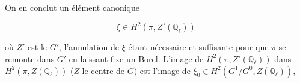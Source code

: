
On en conclut un élément canonique

\[
\xi\in H^2(\pi,Z'(\mathbb Q_\ell))
\]

où $Z'$ est le  $G'$, l'annulation de $\xi$ étant nécessaire et suffisante pour que $\pi$ se remonte dans $G'$ en laissant fixe  un Borel. L'image de $H^2(\pi,Z'(\mathbb Q_\ell))$ dans $H^2(\pi,Z(\mathbb Q_\ell))$ ($Z$ le centre de $G$)  est l'image de $\xi_0\in H^2(G^1/G^0,Z(\mathbb Q_\ell))$, \unsure{$\}$}
